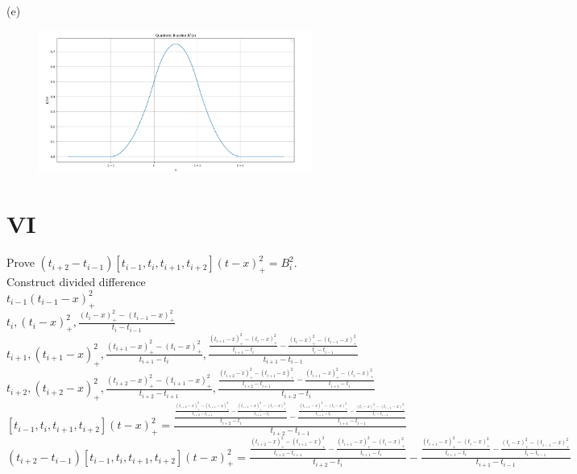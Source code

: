 \documentclass[a4paper]{article}
\begin{document}
(e)
\begin{figure}[H]
  \centering
  \includegraphics[width=0.8\textwidth]{plot.jpg}
\end{figure}

\section*{VI}
Prove $(t_{i+2} - t_{i-1})[t_{i-1}, t_i, t_{i+1}, t_{i+2}](t - x)_+^2 = B_i^2.$\\
Construct divided difference\\
$t_{i-1} (t_{i-1} - x)_+^2$\\
$t_{i}, (t_{i} - x)_+^2,\frac{(t_{i} - x)_+^2-(t_{i-1} - x)_+^2}{t_{i}-t_{i-1}}$\\
$t_{i+1},(t_{i+1} - x)_+^2,\frac{(t_{i+1} - x)_+^2-(t_{i} - x)_+^2}{t_{i+1}-t_{i}},\frac{\frac{(t_{i+1} - x)_+^2-(t_{i} - x)_+^2}{t_{i+1}-t_{i}}-\frac{(t_{i} - x)_+^2-(t_{i-1} - x)_+^2}{t_{i}-t_{i-1}}}{t_{i+1}-t_{i-1}}$\\
$t_{i+2},(t_{i+2} - x)_+^2,\frac{(t_{i+2} - x)_+^2-(t_{i+1} - x)_+^2}{t_{i+2}-t_{i+1}},\frac{\frac{(t_{i+2} - x)_+^2-(t_{i+1} - x)_+^2}{t_{i+2}-t_{i+1}}-\frac{(t_{i+1} - x)_+^2-(t_{i} - x)_+^2}{t_{i+1}-t_{i}}}{t_{i+2}-t_i}$\\
$[t_{i-1}, t_i, t_{i+1}, t_{i+2}](t - x)_+^2=\frac{\frac{\frac{(t_{i+2} - x)_+^2-(t_{i+1} - x)_+^2}{t_{i+2}-t_{i+1}}-\frac{(t_{i+1} - x)_+^2-(t_{i} - x)_+^2}{t_{i+1}-t_{i}}}{t_{i+2}-t_i}-\frac{\frac{(t_{i+1} - x)_+^2-(t_{i} - x)_+^2}{t_{i+1}-t_{i}}-\frac{(t_{i} - x)_+^2-(t_{i-1} - x)_+^2}{t_{i}-t_{i-1}}}{t_{i+1}-t_{i-1}}}{t_{i+2}-t_{i-1}}$\\
$(t_{i+2} - t_{i-1})[t_{i-1}, t_i, t_{i+1}, t_{i+2}](t - x)_+^2=\frac{\frac{(t_{i+2} - x)_+^2-(t_{i+1} - x)_+^2}{t_{i+2}-t_{i+1}}-\frac{(t_{i+1} - x)_+^2-(t_{i} - x)_+^2}{t_{i+1}-t_{i}}}{t_{i+2}-t_i}-\frac{\frac{(t_{i+1} - x)_+^2-(t_{i} - x)_+^2}{t_{i+1}-t_{i}}-\frac{(t_{i} - x)_+^2-(t_{i-1} - x)_+^2}{t_{i}-t_{i-1}}}{t_{i+1}-t_{i-1}}$\\
\end{document}
